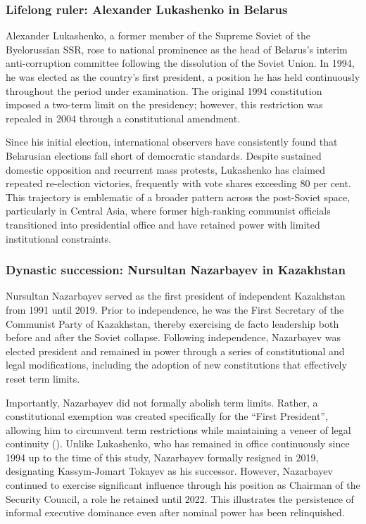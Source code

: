 \documentclass[
  12pt,
]{report}
\begin{document}
\subsubsection*{Lifelong ruler: Alexander Lukashenko in
Belarus}\label{lifelong-ruler-alexander-lukashenko-in-belarus}

Alexander Lukashenko, a former member of the Supreme Soviet of the
Byelorussian SSR, rose to national prominence as the head of Belarus's
interim anti-corruption committee following the dissolution of the
Soviet Union. In 1994, he was elected as the country's first president,
a position he has held continuously throughout the period under
examination. The original 1994 constitution imposed a two-term limit on
the presidency; however, this restriction was repealed in 2004 through a
constitutional amendment.

Since his initial election, international observers have consistently
found that Belarusian elections fall short of democratic standards.
Despite sustained domestic opposition and recurrent mass protests,
Lukashenko has claimed repeated re-election victories, frequently with
vote shares exceeding 80 per cent. This trajectory is emblematic of a
broader pattern across the post-Soviet space, particularly in Central
Asia, where former high-ranking communist officials transitioned into
presidential office and have retained power with limited institutional
constraints.

\subsubsection*{Dynastic succession: Nursultan Nazarbayev in
Kazakhstan}\label{dynastic-succession-nursultan-nazarbayev-in-kazakhstan}

Nursultan Nazarbayev served as the first president of independent
Kazakhstan from 1991 until 2019. Prior to independence, he was the First
Secretary of the Communist Party of Kazakhstan, thereby exercising de
facto leadership both before and after the Soviet collapse. Following
independence, Nazarbayev was elected president and remained in power
through a series of constitutional and legal modifications, including
the adoption of new constitutions that effectively reset term limits.

Importantly, Nazarbayev did not formally abolish term limits. Rather, a
constitutional exemption was created specifically for the ``First
President'', allowing him to circumvent term restrictions while
maintaining a veneer of legal continuity
(). Unlike
Lukashenko, who has remained in office continuously since 1994 up to the
time of this study, Nazarbayev formally resigned in 2019, designating
Kassym-Jomart Tokayev as his successor. However, Nazarbayev continued to
exercise significant influence through his position as Chairman of the
Security Council, a role he retained until 2022. This illustrates the
persistence of informal executive dominance even after nominal power has
been relinquished.
\end{document}

